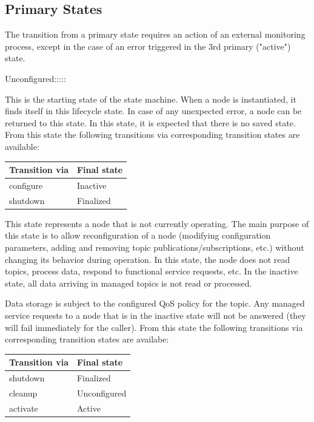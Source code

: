 	\subsection{Primary States}	
	The transition from a primary state requires an action of an external monitoring process, except in the case of an error triggered in the 3rd primary ("active") state.
	\begin{labeling}{Unconfigured:::::}
		\item[\textbf{Unconfigured}] This is the starting state of the state machine. When a node is instantiated, it finds itself in this lifecycle state. In case of any unexpected error, a node can be returned to this state. In this state, it is expected that there is no saved state. From this state the following transitions via corresponding transition states are available:
		\begin{table}[H]
			\centering
			\label{tab:Valid transitions}
			\begin{tabular}{|p{3cm}|p{3cm}|}
				\toprule
				Transition via & Final state\\
				\midrule
				configure & Inactive  \\
				shutdown & Finalized \\
				\bottomrule
			\end{tabular}
		\end{table}

		\item[\textbf{Inactive}] This state represents a node that is not currently operating. The main purpose of this state is to allow reconfiguration of a node (modifying configuration parameters, adding and removing topic publications/subscriptions, etc.) without changing its behavior during operation. In this state, the node does not read topics, process data, respond to functional service requests, etc. In the inactive state, all data arriving in managed topics is not read or processed. 
		
		Data storage is subject to the configured QoS policy for the topic. Any managed service requests to a node that is in the inactive state will not be answered (they will fail immediately for the caller). From this state the following transitions via corresponding transition states are availabe:
		\begin{table}[H]
			\centering
			\label{tab:Valid transitions}
			\begin{tabular}{|p{3cm}|p{3cm}|}
				\toprule
				Transition via & Final state\\
				\midrule
				shutdown & Finalized  \\
				cleanup & Unconfigured \\
				activate & Active \\
				\bottomrule
			\end{tabular}
		\end{table}


\end{labeling}
